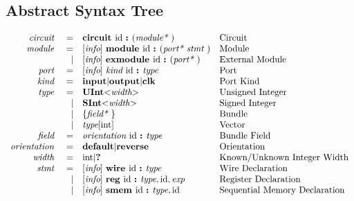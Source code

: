 \documentclass[12pt]{article}
\begin{document}
\subsection{Abstract Syntax Tree}
{\small
\[
\begin{array}{rrll}
\text{\em circuit\ }    &=     &\text{\bf circuit\ } \text{id } \text{\bf :\ } (\text{\em module*\ })                                        &\text{Circuit}\\
\text{\em module\ }     &=     &[\text{\em info}]\  \text{\bf module\ }  \text{id } \text{\bf :\ } (\text{\em port*\ } \text{\em stmt\ })                          &\text{Module}\\
                &\vert &[\text{\em info}]\  \text{\bf exmodule\ }  \text{id } \text{\bf :\ } (\text{\em port*\ })                                  &\text{External Module}\\
\text{\em port\ }       &=     &[\text{\em info}]\  \text{\em kind\ } \text{id } \text{\bf :\ } \text{\em type\ }                                          &\text{Port}\\
\text{\em kind\ }       &=     &\text{\bf input} \vert \text{\bf output} \vert \text{\bf clk}                                &\text{Port Kind}\\
\text{\em type\ }       &=     &\text{\bf UInt} \text{\bf $<$} \text{\em width} \text{\bf $>$}                                    &\text{Unsigned Integer}\\
                &\vert &\text{\bf SInt} \text{\bf $<$} \text{\em width} \text{\bf $>$}                                    &\text{Signed Integer}\\
                &\vert &\{\text{\em field*\ }\}                                                         &\text{Bundle}\\
                &\vert &\text{\em type}[\text{int}]                                                             &\text{Vector}\\
\text{\em field\ }      &=     &\text{\em orientation\ } \text{id } \text{\bf :\ } \text{\em type\ }                                         &\text{Bundle Field}\\
\text{\em orientation\ }&=     &\text{\bf default} \vert \text{\bf reverse}                                             &\text{Orientation}\\
\text{\em width\ }      &=     &\text{int} \vert \text{\bf ?\ }                                                            &\text{Known/Unknown Integer Width}\\
\text{\em stmt\ }       &=     &[\text{\em info}]\  \text{\bf wire\ } \text{id } \text{\bf :\ } \text{\em type\ }                                          &\text{Wire Declaration}\\
                &\vert &[\text{\em info}]\  \text{\bf reg\ } \text{id } \text{\bf :\ }  \text{\em type} , \text{id} , \text{\em exp}                      &\text{Register Declaration}\\
                &\vert &[\text{\em info}]\  \text{\bf smem\ } \text{id } \text{\bf :\ } \text{\em type} , \text{id}                                  &\text{Sequential Memory Declaration}\\

\end{array}\]}
\end{document}
